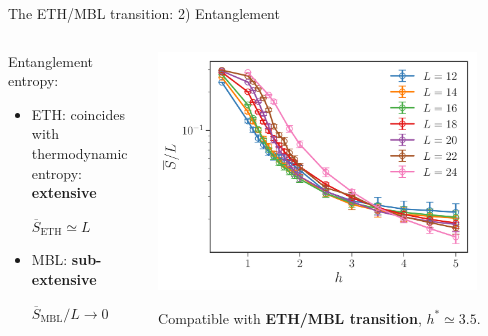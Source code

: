 \begin{frame}{The ETH/MBL transition: 2) Entanglement}
\begin{columns}
\begin{column}{0.5\textwidth}
Entanglement entropy:
\begin{itemize}
	\item \textcolor{comp}{ETH: coincides with thermodynamic entropy: \textbf{extensive}}
	
	$\overline{S}_\text{ETH} \simeq L$
	\item \textcolor{BostonBlue}{MBL: \textbf{sub-extensive}}
	
	$\overline{S}_\text{MBL}/L \to 0$
\end{itemize}
\end{column}
\begin{column}{0.5\textwidth}
\centering
\includegraphics[width=0.9\textwidth]{img/3_Fibonacci/entropy}

Compatible with \textbf{ETH/MBL transition}, $h^* \simeq 3.5$.
\end{column}
\end{columns}
\end{frame}

